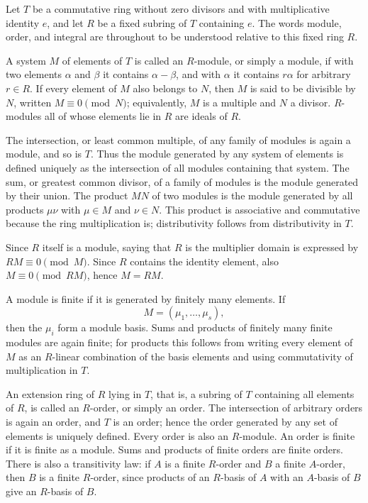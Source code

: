 \documentclass[12pt]{article}
\begin{document}
Let $T$ be a commutative ring without zero divisors and with multiplicative identity $e$, and let $R$ be a fixed subring of $T$ containing $e$. The words module, order, and integral are throughout to be understood relative to this fixed ring $R$.

A system $M$ of elements of $T$ is called an $R$-module, or simply a module, if with two elements $\alpha$ and $\beta$ it contains $\alpha-\beta$, and with $\alpha$ it contains $r\alpha$ for arbitrary $r\in R$. If every element of $M$ also belongs to $N$, then $M$ is said to be divisible by $N$, written $M\equiv0\pmod N$; equivalently, $M$ is a multiple and $N$ a divisor. $R$-modules all of whose elements lie in $R$ are ideals of $R$.

The intersection, or least common multiple, of any family of modules is again a module, and so is $T$. Thus the module generated by any system of elements is defined uniquely as the intersection of all modules containing that system. The sum, or greatest common divisor, of a family of modules is the module generated by their union. The product $MN$ of two modules is the module generated by all products $\mu\nu$ with $\mu\in M$ and $\nu\in N$. This product is associative and commutative because the ring multiplication is; distributivity follows from distributivity in $T$.

Since $R$ itself is a module, saying that $R$ is the multiplier domain is expressed by $RM\equiv0\pmod M$. Since $R$ contains the identity element, also $M\equiv0\pmod{RM}$, hence $M=RM$.

A module is finite if it is generated by finitely many elements. If
\[
  M=(\mu_1,\ldots,\mu_s),
\]
then the $\mu_i$ form a module basis. Sums and products of finitely many finite modules are again finite; for products this follows from writing every element of $M$ as an $R$-linear combination of the basis elements and using commutativity of multiplication in $T$.

An extension ring of $R$ lying in $T$, that is, a subring of $T$ containing all elements of $R$, is called an $R$-order, or simply an order. The intersection of arbitrary orders is again an order, and $T$ is an order; hence the order generated by any set of elements is uniquely defined. Every order is also an $R$-module. An order is finite if it is finite as a module. Sums and products of finite orders are finite orders. There is also a transitivity law: if $A$ is a finite $R$-order and $B$ a finite $A$-order, then $B$ is a finite $R$-order, since products of an $R$-basis of $A$ with an $A$-basis of $B$ give an $R$-basis of $B$.
\end{document}
